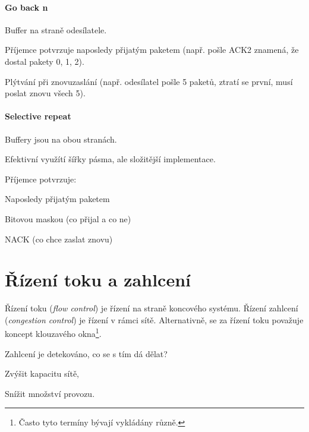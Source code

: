\paragraph*{Go back n} \begin{compactitem}
    \item Buffer na straně odesílatele.
    \item Příjemce potvrzuje naposledy přijatým paketem (např. pošle ACK2 znamená, že dostal pakety 0, 1, 2).
    \item Plýtvání při znovuzaslání (např. odesílatel pošle 5 paketů, ztratí se první, musí poslat znovu všech 5).
\end{compactitem}

\paragraph*{Selective repeat} \begin{compactitem}
    \item Buffery jsou na obou stranách.
    \item Efektivní využítí šířky pásma, ale složitější implementace.
    \item Příjemce potvrzuje: \begin{compactitem}
        \item Naposledy přijatým paketem
        \item Bitovou maskou (co přijal a co ne)
        \item NACK (co chce zaslat znovu)
    \end{compactitem}
\end{compactitem}


\section{Řízení toku a zahlcení}

Řízení toku (\textit{flow control}) je řízení na straně koncového systému. Řízení zahlcení (\textit{congestion control}) je řízení v rámci sítě. Alternativně, se za řízení toku považuje koncept klouzavého okna\footnote{Často tyto termíny bývají vykládány různě.}.

Zahlcení je detekováno, co se s tím dá dělat? \begin{compactitem}
    \item Zvýšit kapacitu sítě,
    \item Snížit množství provozu.
\end{compactitem}

